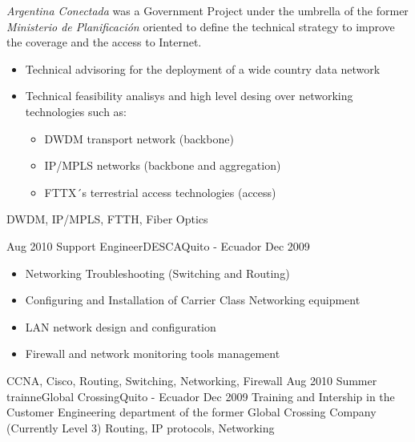 \begin{experiences}
{                      \emph{Argentina Conectada} was a Government Project under the umbrella of the former \emph{Ministerio de Planificación} oriented to define the technical strategy to improve the coverage and the access to Internet.
                      \begin{itemize}
                        \item Technical advisoring for the deployment of a wide country data network
                        \item Technical feasibility analisys and high level desing over networking technologies such as:
                        \begin{itemize}
                        \item DWDM transport network (backbone)
                        \item IP/MPLS networks (backbone and aggregation)
                        \item FTTX´s terrestrial access technologies (access)                                            
                        \end{itemize}
                      \end{itemize}
                  }
                  {DWDM, IP/MPLS, FTTH, Fiber Optics}  

  \emptySeparator         
  \experience
  {Aug 2010}  {Support Engineer}{DESCA}{Quito - Ecuador}
  {Dec 2009}   {
                      \begin{itemize}
                        \item Networking Troubleshooting (Switching and Routing)
                        \item Configuring and Installation of Carrier Class Networking equipment
                        \item LAN network design and configuration
                        \item Firewall and network monitoring tools management
                      \end{itemize}
                }
                  {CCNA, Cisco, Routing, Switching, Networking, Firewall} 
  \emptySeparator         
  \experience
  {Aug 2010}  {Summer trainne}{Global Crossing}{Quito - Ecuador}
  {Dec 2009}   {
                Training and Intership in the Customer Engineering department of the former Global Crossing Company (Currently Level 3)
                }
                  {Routing, IP protocols, Networking} 
\end{experiences}

